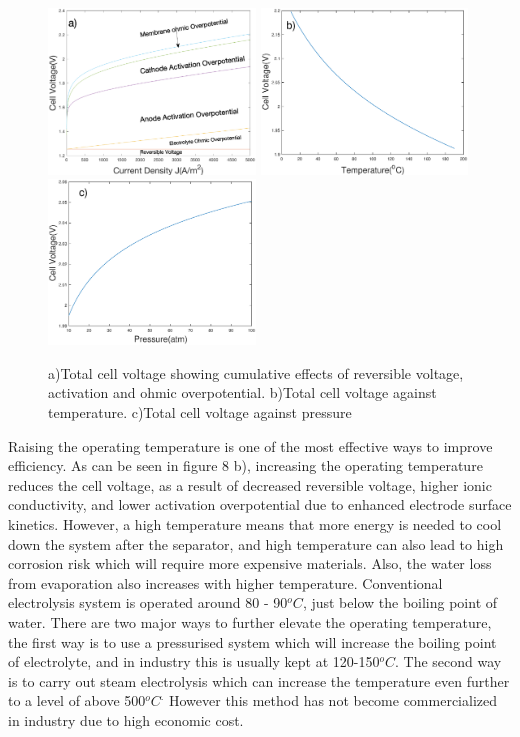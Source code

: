 \begin{figure}[h]
\includegraphics[width=5.5cm]{total.eps}
\includegraphics[width=5.5cm]{cellT.eps}
\includegraphics[width=5.5cm]{cellP.eps}
\caption{a)Total cell voltage showing cumulative effects of reversible voltage, activation and ohmic overpotential. b)Total cell voltage against temperature. c)Total cell voltage against pressure}
\end{figure}
Raising the operating temperature is one of the most effective ways to improve efficiency. As can be seen in figure 8 b), increasing the operating temperature reduces the cell voltage, as a result of decreased reversible voltage, higher ionic conductivity, and lower activation overpotential due to enhanced electrode surface kinetics. However, a high temperature means that more energy is needed to cool down the system after the separator, and high temperature can also lead to high corrosion risk which will require more expensive materials. Also, the water loss from evaporation also increases with higher temperature. Conventional electrolysis system is operated around 80 - 90$^oC$, just below the boiling point of water. There are two major ways to further elevate the operating temperature, the first way is to use a pressurised system which will increase the boiling point of electrolyte, and in industry this is usually kept at 120-150$^oC$. The second way is to carry out steam electrolysis which can increase the temperature even further to a level of above 500$^oC^.$ However this method has not become commercialized in industry due to high economic cost.\cite{temp} \cite{reversible} \\
